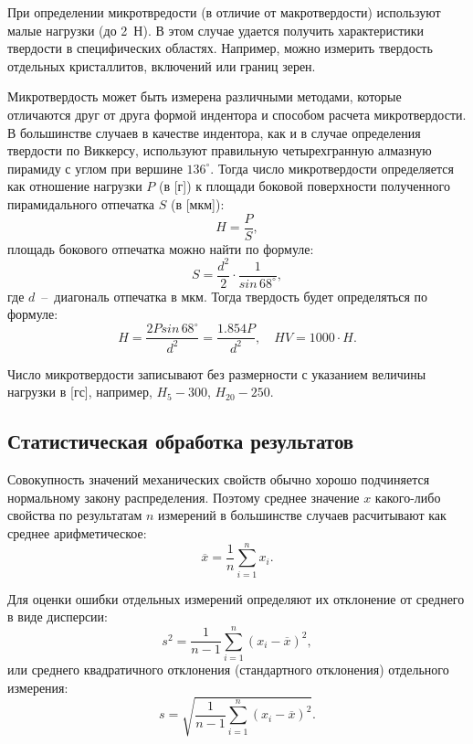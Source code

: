 \documentclass[12pt, a4paper]{article}
\begin{document}
    При определении микротвредости (в отличие от макротвердости) используют малые нагрузки (до 2~Н). В этом случае удается получить характеристики твердости в специфических областях. Например, можно измерить твердость отдельных кристаллитов, включений или границ зерен. 
    
    Микротвердость может быть измерена различными методами, которые отличаются друг от друга формой индентора и способом расчета микротвердости. В большинстве случаев в качестве индентора, как и в случае определения твердости по Виккерсу, используют правильную четырехгранную алмазную пирамиду с углом при вершине $136^\circ$. Тогда число микротвердости определяется как отношение нагрузки $P$ (в [г]) к площади боковой поверхности полученного пирамидального отпечатка $S$ (в [мкм]):
    \begin{equation}
        H = \frac{P}{S},
        \label{eq1}
    \end{equation}
    площадь бокового отпечатка можно найти по формуле:
    \begin{equation}
        S = \frac{d^2}{2} \cdot \frac{1}{sin \, 68^\circ},
        \label{eq2}
    \end{equation}
    где $d$~--~диагональ отпечатка в мкм. Тогда твердость будет определяться по формуле:
    \begin{equation}
        H = \frac{2Psin \, 68^\circ}{d^2} = \frac{1.854 P}{d^2}, \quad HV = 1000 \cdot H.
        \label{eq3}
    \end{equation}
    
    Число микротвердости записывают без размерности с указанием величины нагрузки в [гс], например,  $H_5-300$, $H_{20}-250$.
    
    \subsection{Статистическая обработка результатов}
    
    Совокупность значений механических свойств обыч­но хорошо подчиняется нормальному закону распределения. Поэтому среднее значение $x$ какого-либо свойства по результатам $n$ измерений в большинстве случаев расчитывают как среднее арифметическое:
    \begin{equation}
        \overline{x} = \frac{1}{n} \sum_{i=1}^{n} x_{i}.
        \label{eq4}
    \end{equation}
    
    Для оценки ошибки отдельных измерений определяют их отклонение от среднего в виде дисперсии:
    \begin{equation}
        s^{2} = \frac{1}{n-1} \sum_{i=1}^{n} (x_{i} - \overline{x})^{2},
        \label{eq5}
    \end{equation}
    или среднего квадратичного отклонения (стандартного отклонения) отдельного измерения:
    \begin{equation}
        s = \sqrt{\frac{1}{n-1} \sum_{i=1}^{n} (x_{i} - \overline{x})^{2}}.
        \label{eq6}
    \end{equation}
    
\end{document}
